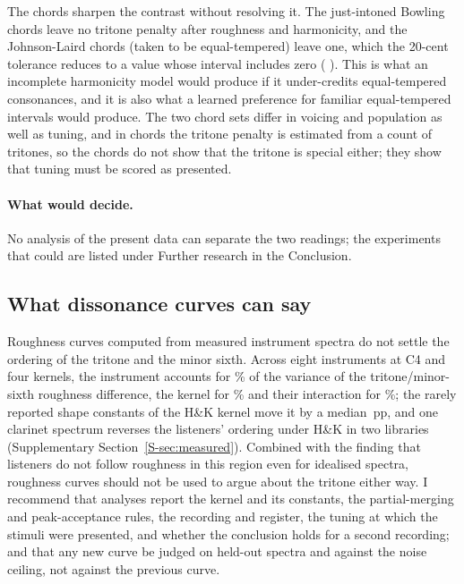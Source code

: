 \documentclass[11pt,a4paper]{article}
\newcommand{\HK}{H\&K}
\newcommand{\pp}{\,pp}
\begin{document}
The chords sharpen the contrast without resolving it. The just-intoned Bowling chords leave
no tritone penalty after roughness and harmonicity, and the Johnson-Laird chords (taken to be equal-tempered) leave one, which the 20-cent tolerance reduces to a value whose interval includes
zero (\csJLTwenty{} \csJLTwentyCI). This is what an
incomplete harmonicity model would produce if it under-credits equal-tempered consonances,
and it is also what a learned preference for familiar equal-tempered intervals would produce.
The two chord sets differ in voicing and population as well as tuning, and in chords the
tritone penalty is estimated from a count of tritones, so the chords do not show that the
tritone is special either; they show that tuning must be scored as presented.

\paragraph{What would decide.}
No analysis of the present data can separate the two readings; the experiments that could are
listed under Further research in the Conclusion.

\subsection{What dissonance curves can say}
Roughness curves computed from measured instrument spectra do not settle the ordering of the
tritone and the minor sixth. Across eight instruments at C4 and four kernels, the instrument
accounts for \shareInstrNoV\% of the variance of the tritone/minor-sixth roughness difference,
the kernel for \shareModelNoV\% and their interaction for \shareInterNoV\%; the rarely reported
shape constants of the \HK{} kernel move it by a median \sensABNarrowMed\pp, and one clarinet
spectrum reverses the listeners' ordering under \HK{} in two libraries (Supplementary
Section~\ref{S-sec:measured}). Combined with the finding that listeners do not follow roughness in
this region even for idealised spectra, roughness curves should not be used to argue about
the tritone either way. I recommend that analyses report the kernel and its constants, the
partial-merging and peak-acceptance rules, the recording and register, the tuning at which
the stimuli were presented, and whether the conclusion holds for a second recording; and that
any new curve be judged on held-out spectra and against the noise ceiling, not against the
previous curve.

\end{document}
